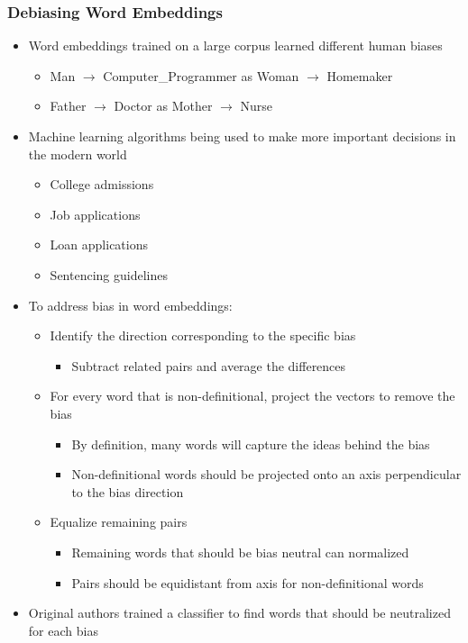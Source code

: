 \documentclass[12pt, letterpaper]{article}
\begin{document}
    \subsubsection{Debiasing Word Embeddings}
    \begin{itemize}
        \item Word embeddings trained on a large corpus learned different human biases
        \begin{itemize}
            \item Man $\rightarrow$ Computer\_Programmer as Woman $\rightarrow$ Homemaker
            \item Father $\rightarrow$ Doctor as Mother $\rightarrow$ Nurse
        \end{itemize}
        \item Machine learning algorithms being used to make more important decisions in the modern world
        \begin{itemize}
            \item College admissions
            \item Job applications
            \item Loan applications
            \item Sentencing guidelines
        \end{itemize}
        \item To address bias in word embeddings:
        \begin{itemize}
            \item Identify the direction corresponding to the specific bias 
            \begin{itemize}
                \item[] Subtract related pairs and average the differences
            \end{itemize}
            \item For every word that is non-definitional, project the vectors to remove the bias
            \begin{itemize}
                \item[] By definition, many words will capture the ideas behind the bias
                \item[] Non-definitional words should be projected onto an axis perpendicular to the bias direction 
            \end{itemize}
            \item Equalize remaining pairs
            \begin{itemize}
                \item[] Remaining words that should be bias neutral can normalized 
                \item[] Pairs should be equidistant from axis for non-definitional words
            \end{itemize}
        \end{itemize}
        \item Original authors trained a classifier to find words that should be neutralized for each bias
    \end{itemize}
\end{document}
